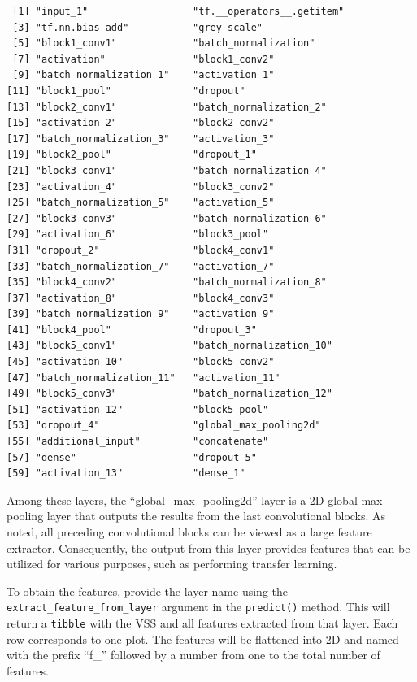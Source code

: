 \documentclass[
doublespace,
  times]{anzsauth}
\begin{document}
\begin{verbatim}
 [1] "input_1"                  "tf.__operators__.getitem"
 [3] "tf.nn.bias_add"           "grey_scale"              
 [5] "block1_conv1"             "batch_normalization"     
 [7] "activation"               "block1_conv2"            
 [9] "batch_normalization_1"    "activation_1"            
[11] "block1_pool"              "dropout"                 
[13] "block2_conv1"             "batch_normalization_2"   
[15] "activation_2"             "block2_conv2"            
[17] "batch_normalization_3"    "activation_3"            
[19] "block2_pool"              "dropout_1"               
[21] "block3_conv1"             "batch_normalization_4"   
[23] "activation_4"             "block3_conv2"            
[25] "batch_normalization_5"    "activation_5"            
[27] "block3_conv3"             "batch_normalization_6"   
[29] "activation_6"             "block3_pool"             
[31] "dropout_2"                "block4_conv1"            
[33] "batch_normalization_7"    "activation_7"            
[35] "block4_conv2"             "batch_normalization_8"   
[37] "activation_8"             "block4_conv3"            
[39] "batch_normalization_9"    "activation_9"            
[41] "block4_pool"              "dropout_3"               
[43] "block5_conv1"             "batch_normalization_10"  
[45] "activation_10"            "block5_conv2"            
[47] "batch_normalization_11"   "activation_11"           
[49] "block5_conv3"             "batch_normalization_12"  
[51] "activation_12"            "block5_pool"             
[53] "dropout_4"                "global_max_pooling2d"    
[55] "additional_input"         "concatenate"             
[57] "dense"                    "dropout_5"               
[59] "activation_13"            "dense_1"                 
\end{verbatim}

Among these layers, the ``global\_max\_pooling2d'' layer is a 2D global
max pooling layer that outputs the results from the last convolutional
blocks. As \citet{simonyan2014very} noted, all preceding convolutional
blocks can be viewed as a large feature extractor. Consequently, the
output from this layer provides features that can be utilized for
various purposes, such as performing transfer learning.

To obtain the features, provide the layer name using the
\texttt{extract\_feature\_from\_layer} argument in the
\texttt{predict()} method. This will return a \texttt{tibble} with the
VSS and all features extracted from that layer. Each row corresponds to
one plot. The features will be flattened into 2D and named with the
prefix ``f\_'' followed by a number from one to the total number of
features.
\end{document}
